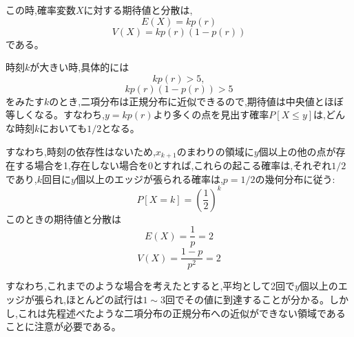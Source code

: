 この時,確率変数$X$に対する期待値と分散は,
\[E(X) = kp(r)\]
\[V(X) = kp(r)(1-p(r))\]
である。

時刻$k$が大きい時,具体的には
\[kp(r) > 5,\]
\[kp(r)(1-p(r)) > 5\]
をみたす$k$のとき,二項分布は正規分布に近似できるので,期待値は中央値とほぼ等しくなる。すなわち,$y=kp(r)$より多くの点を見出す確率$P[X\le y]$は,どんな時刻$k$においても$1/2$となる。

すなわち,時刻の依存性はないため,$x_{k+1}$のまわりの領域に$y$個以上の他の点が存在する場合を1,存在しない場合を0とすれば,これらの起こる確率は,それぞれ$1/2$であり,$k$回目に$y$個以上のエッジが張られる確率は,$p=1/2$の幾何分布に従う:
\[P[X=k] = \left( \frac{1}{2} \right)^{k}\]
このときの期待値と分散は
\[E(X) = \frac{1}{p} = 2\]
\[V(X) = \frac{1-p}{p^{2}} = 2\]

すなわち,これまでのような場合を考えたとすると,平均として2回で$y$個以上のエッジが張られ,ほとんどの試行は$1\sim3$回でその値に到達することが分かる。しかし,これは先程述べたような二項分布の正規分布への近似ができない領域であることに注意が必要である。
